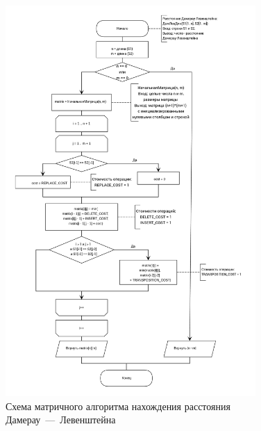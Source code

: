 \begin{figure}[!htb]
\centering
\includegraphics[width=0.85\textwidth]{img/damerau_levenshtein_dynamic.png}
\caption{Схема матричного алгоритма нахождения расстояния Дамерау~---~Левенштейна}
\label{fig:dyn_dam_lev}
\end{figure}